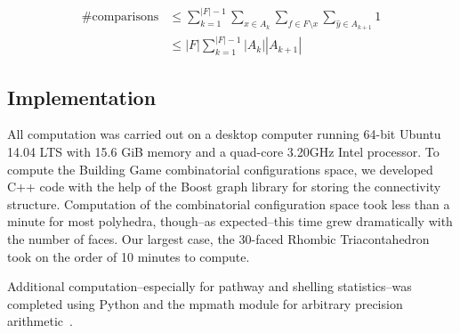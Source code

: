 \begin{align}
\#\text{comparisons} &\leq \sum_{k=1}^{|F|-1} \sum_{x \in A_k} \sum_{f \in F\setminus x} \sum_{\hat{y} \in A_{k+1}} 1 \\
&\leq |F|\sum_{k=1}^{|F|-1}|A_k||A_{k+1}| 
\end{align}


\subsection{Implementation}
All computation was carried out on a desktop computer running 64-bit Ubuntu 14.04 LTS with 15.6 GiB memory and a quad-core 3.20GHz Intel processor. To compute the Building Game combinatorial configurations space, we developed C++ code with the help of the Boost graph library for storing the connectivity structure. Computation of the combinatorial configuration space took less than a minute for most polyhedra, though--as expected--this time grew dramatically with the number of faces. Our largest case, the 30-faced Rhombic Triacontahedron took on the order of 10 minutes to compute. 

Additional computation--especially for pathway and shelling statistics--was completed using Python and the mpmath module for arbitrary precision arithmetic~\cite{mpmath}. 
